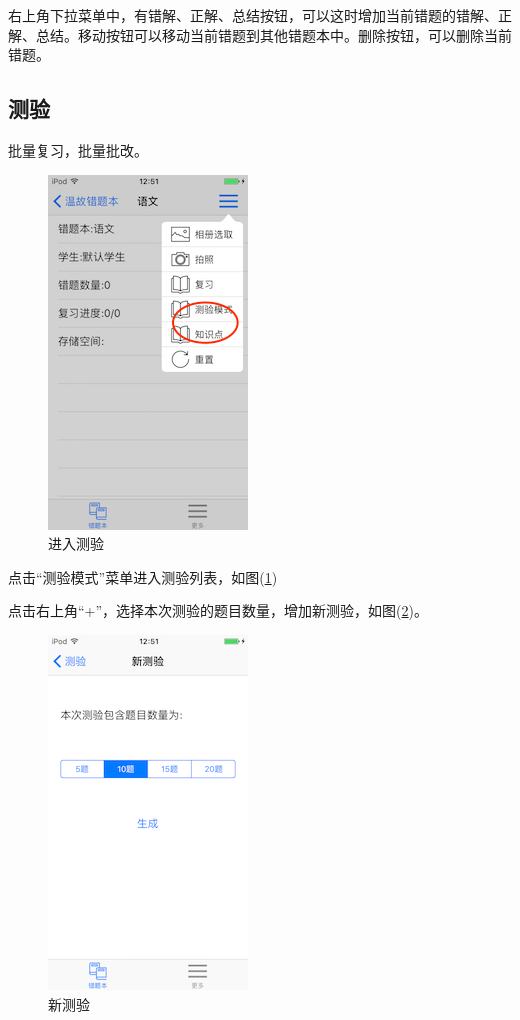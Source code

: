 右上角下拉菜单中，有错解、正解、总结按钮，可以这时增加当前错题的错解、正解、总结。移动按钮可以移动当前错题到其他错题本中。删除按钮，可以删除当前错题。

\subsection{测验}
批量复习，批量批改。
\begin{figure}[H]
	\centering
	\includegraphics{img/32.png}
	\caption{进入测验}
	\label{img32}
\end{figure}
点击“测验模式”菜单进入测验列表，如图(\ref{img32})

点击右上角“+”，选择本次测验的题目数量，增加新测验，如图(\ref{img33})。
\begin{figure}[H]
	\centering
	\includegraphics{img/33.png}
	\caption{新测验}
	\label{img33}
\end{figure}


